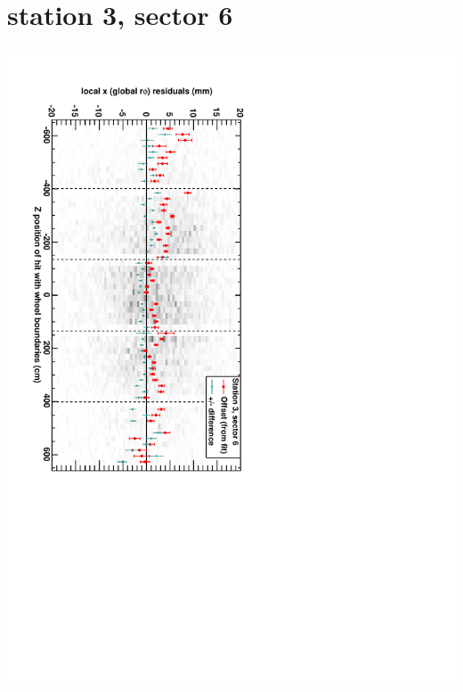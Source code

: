 \documentclass[compress]{beamer}
\begin{document}
\section*{station 3, sector 6}
\begin{frame} \vfill \mbox{\hspace{-1 cm}\includegraphics[height=1.2\linewidth, angle=90]{DTrphiVsZ_st3_sr06.pdf}} \end{frame}
\end{document}
